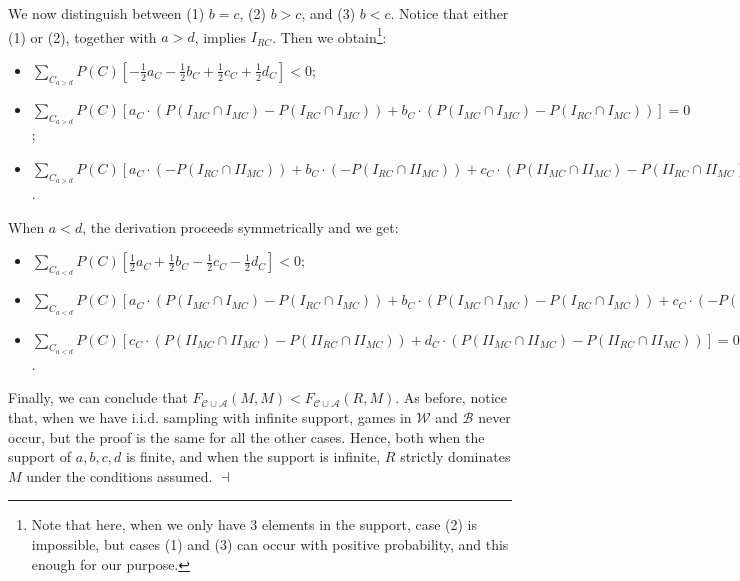 \documentclass[fleqn,reqno,11pt]{article}
\begin{document}
\noindent We now distinguish between (1) $b=c$, (2) $b>c$, and (3) $b<c$. Notice that either
(1) or (2), together with $a>d$, implies $I_{RC}$. Then we obtain\footnote{Note that here, when
  we only have 3 elements in the support, case (2) is impossible, but cases (1) and (3) can
  occur with positive probability, and this enough for our purpose.}:
\begin{itemize}

\item[(1)] $\sum_{C_{a>d}} P(C)[-\frac{1}{2}a_{C} - \frac{1}{2}b_{C} + \frac{1}{2}c_{C} + \frac{1}{2}d_{C}]< 0$;

\item[(2)] $\sum_{C_{a>d}} P(C)[a_{C} \cdot (P(I_{MC}\cap I_{MC}) - P(I_{RC}\cap I_{MC})) + b_{C} \cdot  (P(I_{MC}\cap I_{MC}) - P(I_{RC}\cap I_{MC}))]= 0$;

\item[(3)] $\sum_{C_{a>d}} P(C)[a_{C} \cdot (- P(I_{RC}\cap II_{MC})) + b_{C} \cdot  (- P(I_{RC}\cap II_{MC})) + c_{C} \cdot (P(II_{MC}\cap II_{MC})- P(II_{RC}\cap II_{MC})) + d_{C} \cdot (P(II_{MC}\cap II_{MC})- P(II_{RC}\cap II_{MC}))] \leq 0$.

\end{itemize}

\noindent When $a<d$, the derivation proceeds symmetrically and we get: 

\begin{itemize}

\item[(1)] $\sum_{C_{a<d}} P(C)[\frac{1}{2}a_{C} + \frac{1}{2}b_{C} - \frac{1}{2}c_{C} - \frac{1}{2}d_{C}]< 0$;

\item[(2)] $\sum_{C_{a<d}} P(C)[a_{C} \cdot (P(I_{MC}\cap I_{MC}) - P(I_{RC}\cap I_{MC})) + b_{C} \cdot  (P(I_{MC}\cap I_{MC}) - P(I_{RC}\cap I_{MC})) + c_{C} \cdot (- P(II_{RC}\cap I_{MC})) + d_{C} \cdot (- P(II_{RC}\cap I_{MC}))] \leq 0$

\item[(3)] $\sum_{C_{a<d}} P(C)[c_{C} \cdot (P(II_{MC}\cap II_{MC})- P(II_{RC}\cap II_{MC})) + d_{C} \cdot (P(II_{MC}\cap II_{MC})- P(II_{RC}\cap II_{MC}))] = 0$.

\end{itemize}


\noindent Finally, we can conclude that
$F_{\mathcal{C}\cup\mathcal{A}}(M,M)<F_{\mathcal{C}\cup\mathcal{A}}(R,M)$. As before, notice
that, when we have i.i.d. sampling with infinite support, games in $\mathcal{W}$ and
$\mathcal{B}$ never occur, but the proof is the same for all the other cases. Hence, both when
the support of $a,b,c,d$ is finite, and when the support is infinite, $R$ strictly dominates
$M$ under the conditions assumed. \hfill $\dashv$



\printbibliography[heading=bibintoc]
\end{document}
